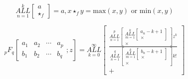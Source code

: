 \documentclass{article}
\begin{document}
$$\underset{n=1}{\overset{k}{ALL}} \begin{bmatrix}
a \\
\star_f
\end{bmatrix} = a, x \star_f y = \text{max}(x,y) \text{ or } \text{min}(x,y)$$

$$
{}_{p}F_{q} \left[
\begin{array}{cccc}
a_1 & a_2 & \cdots & a_p \\
b_1 & b_2 & \cdots & b_q
\end{array}
; z
\right] = \underset{k=0}{\overset{\infty}{ALL}} \begin{bmatrix}

\frac{\underset{n=1}{\overset{p}{ALL}} \begin{bmatrix}
\underset{m=1}{\overset{k}{ALL}} \begin{bmatrix}
a_n-k+1 \\
\times
\end{bmatrix} \\
\times
\end{bmatrix}z^k}{\underset{n=1}{\overset{q}{ALL}} \begin{bmatrix}
\underset{m=1}{\overset{k}{ALL}} \begin{bmatrix}
b_n-k+1 \\
\times
\end{bmatrix} \\
\times
\end{bmatrix}k!}
\\
+
\end{bmatrix}$$
\end{document}
